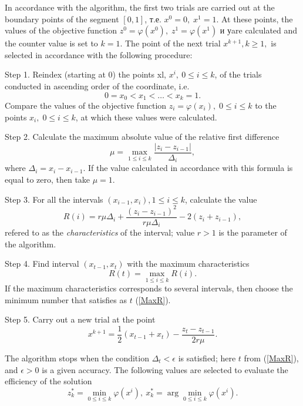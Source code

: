 \documentclass[entropy,article,submit,moreauthors,pdftex]{Definitions/mdpi}
\begin{document}
In accordance with the algorithm, the first two trials are carried out at the boundary points of the segment $[0,1]$, т.е. $x^0=0,\;x^1=1$. 
At these points, the values of the objective function  $z^0=\varphi(x^0),\;z^1=\varphi(x^1)$ и уare calculated and the counter value is set to $k=1$. 
The point of the next trial $x^{k+1}, k\geq 1,$ is selected in accordance with the following procedure:

 Step 1. Reindex  (starting at 0) the points xl, $x^i,\:0\leq i\leq k$, of the trials conducted  in ascending order of the coordinate, i.e.
\begin{equation}\label{xt}
0=x_0<x_1<\ldots <x_{k}=1.
\end{equation} 
Compare the values of the objective function $z_i=\varphi(x_i), \; 0\leq i\leq k$ to the points $x_i, \; 0\leq i\leq k$, at which these values were calculated.

Step 2. Calculate the maximum absolute value of the relative first difference
\begin{equation}\label{mu}
\mu=\max_{1\leq i\leq k}\frac{\left|z_i-z_{i-1}\right|}{\Delta_i},
\end{equation}
where $\Delta_i = x_i-x_{i-1}$. If the value calculated in accordance with this formula is equal to zero, then take $\mu = 1$.

Step 3. For all the intervals $(x_{i-1},x_i),1\leq i\leq k$,  calculate the value
\begin{equation}\label{R}
R(i)=r\mu\Delta_i+\frac{(z_i-z_{i-1})^2}{r\mu\Delta_i}-2(z_i+z_{i-1}),
\end{equation} 
refered to as the \textit{characteristics} of the interval; value $r>1$ is the parameter of the algorithm. 

Step 4. Find interval $(x_{t-1},x_t)$ with the maximum characteristics
\begin{equation}\label{MaxR}
R(t)=\max_{1\leq i\leq {k}}R(i).
\end{equation}
If the maximum characteristics corresponds to several intervals, then choose the minimum number that satisfies as $t$ (\ref{MaxR}).

Step 5. Carry out a new trial at the point
\begin{equation}\label{xk1}
x^{k+1}=\frac{1}{2}(x_{t-1}+x_t) - \frac{z_t-z_{t-1}}{2r\mu}.
\end{equation}

The algorithm stops when the condition  $\Delta_t<\epsilon$ is satisfied; here $t$ from (\ref{MaxR}), and $\epsilon>0$ is a given accuracy. 
The following values are selected to evaluate the efficiency of the solution
\[
z_k^\ast=\min_{0\leq i \leq k}\varphi(x^i), \ x_k^\ast=\arg \min_{0\leq i \leq
 k}\varphi(x^i).
\] 
\end{document}
